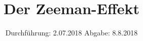 
\subject{V27}
\title{\texorpdfstring{Der Zeeman-Effekt}{}}
\date{
	Durchführung: 2.07.2018
	\hspace{4em}
	Abgabe: 8.8.2018
}


	\maketitle
	\newpage
	\tableofcontents
	\newpage
	
	
	
	
	
	
	\newpage

	\printbibliography

